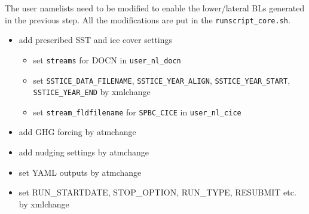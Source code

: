 \documentclass[journal abbreviation, manuscript]{copernicus}
\begin{document}
The user namelists need to be modified to enable the lower/lateral BLs generated in the previous step. All the modifications are put in the \lstinline|runscript_core.sh|. 

\begin{itemize}
  \item add prescribed SST and ice cover settings
    \begin{itemize}
    \item set \verb|streams| for DOCN in \verb|user_nl_docn|
    \item set \verb|SSTICE_DATA_FILENAME|, \verb|SSTICE_YEAR_ALIGN|, \verb|SSTICE_YEAR_START|, \verb|SSTICE_YEAR_END| by xmlchange
    \item set \verb|stream_fldfilename| for \verb|SPBC_CICE| in \verb|user_nl_cice|
    \end{itemize}
  \item add GHG forcing by atmchange
  \item add nudging settings by atmchange
  \item set YAML outputs by atmchange
  \item set RUN\_STARTDATE, STOP\_OPTION, RUN\_TYPE, RESUBMIT etc. by xmlchange
\end{itemize}
\vspace{\baselineskip}
\end{document}
